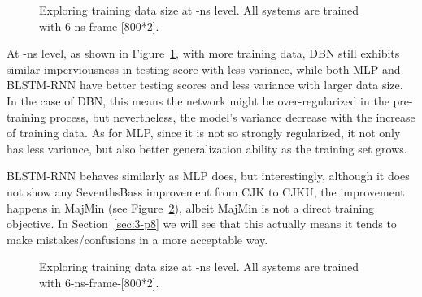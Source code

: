 \begin{figure}[h]

	\caption{Exploring training data size at -ns level. All systems are trained with 6-ns-frame-[800*2].}
	\label{fig:3-ns-data}
\end{figure}

At -ns level, as shown in Figure~\ref{fig:3-ns-data}, with more training data, DBN still exhibits similar imperviousness in testing score with less variance, while both MLP and BLSTM-RNN have better testing scores and less variance with larger data size. In the case of DBN, this means the network might be over-regularized in the pre-training process, but nevertheless, the model's variance decrease with the increase of training data. As for MLP, since it is not so strongly regularized, it not only has less variance, but also better generalization ability as the training set grows.

BLSTM-RNN behaves similarly as MLP does, but interestingly, although it does not show any SeventhsBass improvement from CJK to CJKU, the improvement happens in MajMin (see Figure~\ref{fig:3-ns-data-Mm}), albeit MajMin is not a direct training objective. In Section~\ref{sec:3-p8} we will see that this actually means it tends to make mistakes/confusions in a more acceptable way.
\begin{figure}[h]
	\centering
	\caption{Exploring training data size at -ns level. All systems are trained with 6-ns-frame-[800*2].}
	\label{fig:3-ns-data-Mm}
\end{figure}

